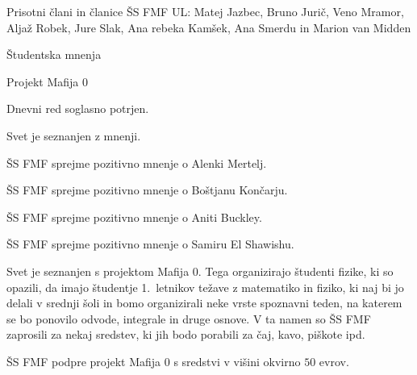 \documentclass{seja}
\begin{document}
Prisotni člani in članice ŠS FMF UL:
 Matej Jazbec,  Bruno Jurič,  Veno Mramor, Aljaž
Robek,  Jure Slak,  Ana rebeka Kamšek, Ana Smerdu in Marion van Midden

\begin{red}
\item Študentska mnenja
\item Projekt Mafija 0
\end{red}
Dnevni red soglasno potrjen.
\begin{ad}
\item Svet je seznanjen z mnenji.
\begin{sklep*}
ŠS FMF sprejme pozitivno mnenje o Alenki Mertelj.
\end{sklep*}
\begin{sklep*}
ŠS FMF sprejme pozitivno mnenje o Boštjanu Končarju.
\end{sklep*}
\begin{sklep*}
ŠS FMF sprejme pozitivno mnenje o Aniti Buckley.
\end{sklep*}
\begin{sklep*}
ŠS FMF sprejme pozitivno mnenje o Samiru El Shawishu.
\end{sklep*}



\item Svet je seznanjen s projektom Mafija 0. Tega organizirajo študenti fizike, ki so  opazili, da imajo študentje 1.~letnikov težave z matematiko in fiziko, ki naj bi jo delali v srednji šoli in bomo organizirali neke vrste spoznavni teden, na katerem se bo ponovilo odvode, integrale in druge osnove. V ta namen so ŠS FMF zaprosili za nekaj sredstev, ki jih bodo porabili za čaj, kavo, piškote ipd.

    \begin{sklep*}
     ŠS FMF podpre projekt Mafija 0 s sredstvi v višini okvirno $50$ evrov.
    \end{sklep*}
\end{ad}
\end{document}
